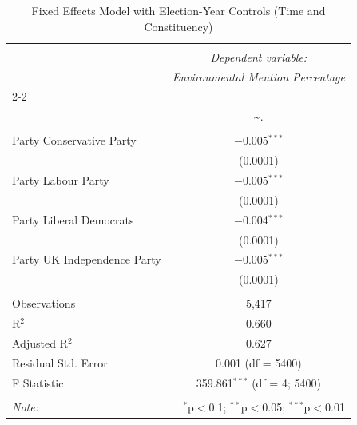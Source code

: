 \documentclass[preprint,12pt,authoryear]{elsarticle}
\begin{document}
\begin{table}[!htbp] \centering
	\caption{Fixed Effects Model with Election-Year Controls (Time and Constituency)}
	\label{tab:time_constituency_fe}
	\footnotesize %
	\setlength{\tabcolsep}{4pt} %
	\renewcommand{\arraystretch}{0.9} %
\begin{tabular}{@{\extracolsep{5pt}}lc}
\\[-1.8ex]\hline
\hline \\[-1.8ex]
 & \multicolumn{1}{c}{\textit{Dependent variable:}} \\
 & \multicolumn{1}{c}{\textit{Environmental Mention Percentage}} \\
\cline{2-2}
\\[-1.8ex] & \textasciitilde . \\
\hline \\[-1.8ex]
 Party Conservative Party & $-$0.005$^{***}$ \\
	& (0.0001) \\
 Party Labour Party & $-$0.005$^{***}$ \\
	& (0.0001) \\
 Party Liberal Democrats & $-$0.004$^{***}$ \\
	& (0.0001) \\
 Party UK Independence Party & $-$0.005$^{***}$ \\
	& (0.0001) \\
 \hline \\[-1.8ex] 
Observations & 5,417 \\
R$^{2}$ & 0.660 \\
Adjusted R$^{2}$ & 0.627 \\
Residual Std. Error & 0.001 (df = 5400) \\
F Statistic & 359.861$^{***}$ (df = 4; 5400) \\
\hline
\hline \\[-1.8ex]
\textit{Note:}  & \multicolumn{1}{r}{$^{*}$p$<$0.1; $^{**}$p$<$0.05; $^{***}$p$<$0.01} \\
\end{tabular}
\end{table}
\end{document}
